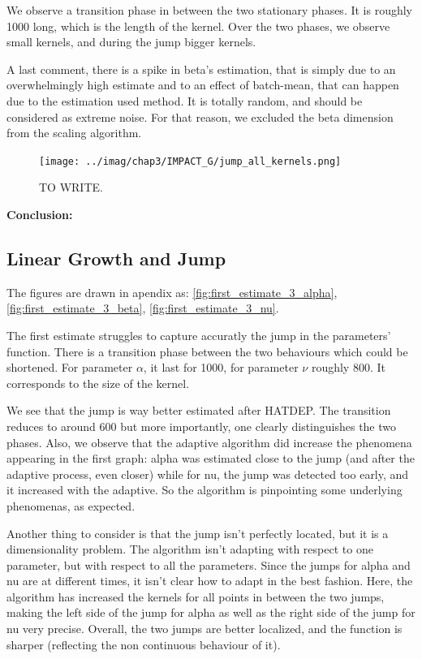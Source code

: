 \documentclass[11pt]{book}
\begin{document}
We observe a transition phase in between the two stationary phases. It is roughly 1000 long, which is the length of the kernel. Over the two phases, we observe small kernels, and during the jump bigger kernels. 


A last comment, there is a spike in beta's estimation, that is simply due to an overwhelmingly high estimate and to an effect of batch-mean, that can happen due to the estimation used method. It is totally random, and should be considered as extreme noise. For that reason, we excluded the beta dimension from the scaling algorithm.


\begin{figure}
\centering
\texttt{[image: ../imag/chap3/IMPACT\_G/jump\_all\_kernels.png]}
\caption{TO WRITE.}
\label{fig:impact_g_jump}
\end{figure}


\textbf{Conclusion:}





\subsection{Linear Growth and Jump}
The figures are drawn in apendix as: \ref{fig:first_estimate_3_alpha}, \ref{fig:first_estimate_3_beta}, \ref{fig:first_estimate_3_nu}.

The first estimate struggles to capture accuratly the jump in the parameters' function. There is a transition phase between the two behaviours which could be shortened. For parameter $\alpha$, it last for 1000, for parameter $\nu$ roughly 800. It corresponds to the size of the kernel.

We see that the jump is way better estimated after HATDEP. The transition reduces to around 600 but more importantly, one clearly distinguishes the two phases. Also, we observe that the adaptive algorithm did increase the phenomena appearing in the first graph: alpha was estimated close to the jump (and after the adaptive process, even closer) while for nu, the jump was detected too early, and it increased with the adaptive. So the algorithm is pinpointing some underlying phenomenas, as expected.

Another thing to consider is that the jump isn't perfectly located, but it is a dimensionality problem. The algorithm isn't adapting with respect to one parameter, but with respect to all the parameters. Since the jumps for alpha and nu are at different times, it isn't clear how to adapt in the best fashion. Here, the algorithm has increased the kernels for all points in between the two jumps, making the left side of the jump for alpha as well as the right side of the jump for nu very precise. Overall, the two jumps are better localized, and the function is sharper (reflecting the non continuous behaviour of it).
\end{document}
